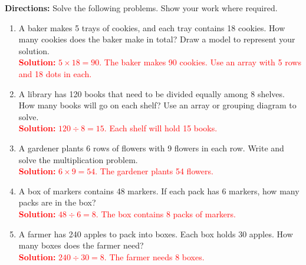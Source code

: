\documentclass[11pt]{article}
\begin{document}
\begin{tcolorbox}[colframe=black!60, colback=white, 
coltitle=black, colbacktitle=black!15, fonttitle=\bfseries\Large, 
title=Problems, halign title=center, left=10pt, right=10pt, top=10pt, bottom=60pt]
\textbf{Directions:} Solve the following problems. Show your work where required.

\begin{enumerate}[start=9, itemsep=7em]
    \item A baker makes 5 trays of cookies, and each tray contains 18 cookies. How many cookies does the baker make in total? Draw a model to represent your solution.\\
    \textcolor{red}{\textbf{Solution:} \(5 \times 18 = 90\). The baker makes 90 cookies. Use an array with 5 rows and 18 dots in each.}

    \item A library has 120 books that need to be divided equally among 8 shelves. How many books will go on each shelf? Use an array or grouping diagram to solve.\\
    \textcolor{red}{\textbf{Solution:} \(120 \div 8 = 15\). Each shelf will hold 15 books.}

    \item A gardener plants 6 rows of flowers with 9 flowers in each row. Write and solve the multiplication problem.\\
    \textcolor{red}{\textbf{Solution:} \(6 \times 9 = 54\). The gardener plants 54 flowers.}

    \item A box of markers contains 48 markers. If each pack has 6 markers, how many packs are in the box?\\
    \textcolor{red}{\textbf{Solution:} \(48 \div 6 = 8\). The box contains 8 packs of markers.}

    \item A farmer has 240 apples to pack into boxes. Each box holds 30 apples. How many boxes does the farmer need?\\
    \textcolor{red}{\textbf{Solution:} \(240 \div 30 = 8\). The farmer needs 8 boxes.}
\end{enumerate}
\end{tcolorbox}

\vspace{1em}
\end{document}
